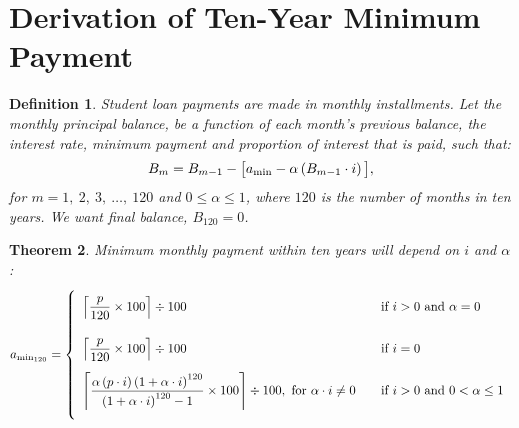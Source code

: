 \documentclass[12pt,letterpaper,oneside]{article}
\newtheorem{theorem}{Theorem}[section] %
\newtheorem{definition}[theorem]{Definition} %
\theoremstyle{remark} %
\begin{document}
	\newpage
	
\section{Derivation of Ten-Year Minimum Payment}%

	\begin{definition}
	Student loan payments are made in monthly installments. Let the monthly principal balance, be a function of each month's previous balance, the interest rate, minimum payment and proportion of interest that is paid, such that:
	\begin{equation}
	B_{m}=B_{m-1}-\big[a_{\rm{min}}-\alpha\left(B_{m-1}\cdot i\right)\big],\label{eq}
	\end{equation}
	for $m=1,\ 2,\ 3,\ \dots,\ 120$ and $0\leq\alpha\leq1$, where $120$ is the number of months in ten years. 
	We want final balance, $B_{120}=0$.
	\end{definition}

	\renewcommand{\base}{\left(1+\alpha\cdot i\right)}
	\begin{theorem}
	Minimum monthly payment within ten years will depend on $i$ and $\alpha$:
	\small
	\[
	a_{\rm{min_{120}}}=
	\left\{
	\begin{array}{l l}
	\\[-6pt]
	\left\lceil{\dfrac{p}{120}\times 100}\right\rceil\div 100&\quad\mbox{if } i>0 \mbox{ and }\alpha=0\\[18pt]
	\left\lceil{\dfrac{p}{120}\times 100}\right\rceil\div 100&\quad\mbox{if } i=0\\[12pt]
	\left\lceil{\dfrac{\alpha\left(p\cdot i\right)\base^{120}}{\base^{120}-1}\times 100}\right\rceil\div 100,\mbox{ for }\alpha\cdot i\neq 0 &\quad\mbox{if } i>0\mbox{ and }0<\alpha\leq1
	\\[18pt]
	\end{array}
	\right. 
	\]
	\end{theorem}

	\renewcommand{\bo}{p\left(1+\alpha\cdot i\right)-a_{\rm{min}}}
	\newcommand{\bt}{p\left(1+\alpha\cdot i\right)^{2}-\left(1+\alpha\cdot i\right)a_{\rm{min}}-a_{\rm{min}}}
	\renewcommand{\base}{\left(1+\alpha\cdot i\right)} %
\end{document}
